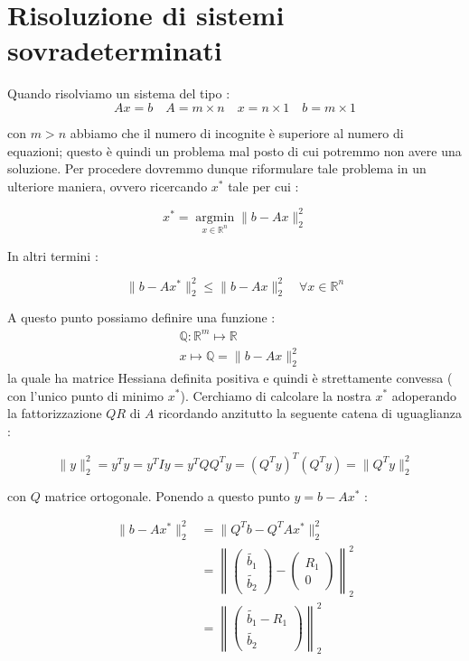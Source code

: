\documentclass[12pt, a4paper]{book}
\theoremstyle{definition}
\begin{document}
\section{Risoluzione di sistemi sovradeterminati}
\begin{flushleft}

Quando risolviamo un sistema del tipo : 
\[
	Ax = b \quad A= m \times n \quad x = n \times 1 \quad b = m \times 1
\]

con $m > n$ abbiamo che il numero di incognite è superiore al numero di equazioni; questo è quindi un problema mal posto di cui potremmo non avere una soluzione. 
Per procedere dovremmo dunque riformulare tale problema in un ulteriore maniera, ovvero ricercando $x^{*}$ tale per cui :

\[ 
	x^{*} = \operatorname*{argmin}_{x \in \mathbb{R}^{n}}  \lVert b - Ax  \rVert ^ {2} _{2}
\]

In altri termini : 

\[ 
	 \lVert b - Ax^{*}  \rVert ^ {2} _{2} \leq \lVert b - Ax  \rVert ^ {2}  _{2} \quad \forall x \in \mathbb{R}^{n}
\]

A questo punto possiamo definire una funzione :
\[ 
	\begin{split}
		& \mathbb{Q} : \mathbb{R}^{m} \mapsto \mathbb{R} \\
		& x \mapsto  \mathbb{Q} =  \lVert b - Ax  \rVert ^ {2}  _{2}
	\end{split}
\]
la quale ha matrice Hessiana definita positiva e quindi è strettamente convessa ( con l'unico punto di minimo $x^{*}$).
Cerchiamo di calcolare la nostra $x^{*}$ adoperando la fattorizzazione $QR$ di $A$ ricordando anzitutto la seguente catena di uguaglianza : 

\[ 
	 \lVert y \rVert ^{2}_{2} = y^{T}y = y^{T}Iy = y^{T}QQ^{T}y = (Q^{T}y)^{T}(Q^{T}y) =  \lVert Q^{T}y \rVert ^{2}_{2}
\]

con $Q$ matrice ortogonale.  Ponendo a questo punto $y = b - Ax^{*}$  :

\[ 
	\begin{split}
	 	\lVert b - Ax^{*}  \rVert ^ {2} _{2} &=  \lVert Q^{T}b - Q^{T}Ax^{*}  \rVert ^ {2} _{2} \\
	 	&=  \left\lVert \begin{pmatrix} \tilde{b_{1}} \\ \tilde{b_{2}} \end{pmatrix} - \begin{pmatrix} R_{1} \\ 0 \end{pmatrix} \right\rVert^{2}_{2} \\
	 	&=  \left\lVert \begin{pmatrix} \tilde{b_{1}} - R_{1} \\ \tilde{b_{2}} \end{pmatrix}  \right\rVert^{2}_{2} \\
	 \end{split}
\]


\end{flushleft}
\end{document}
